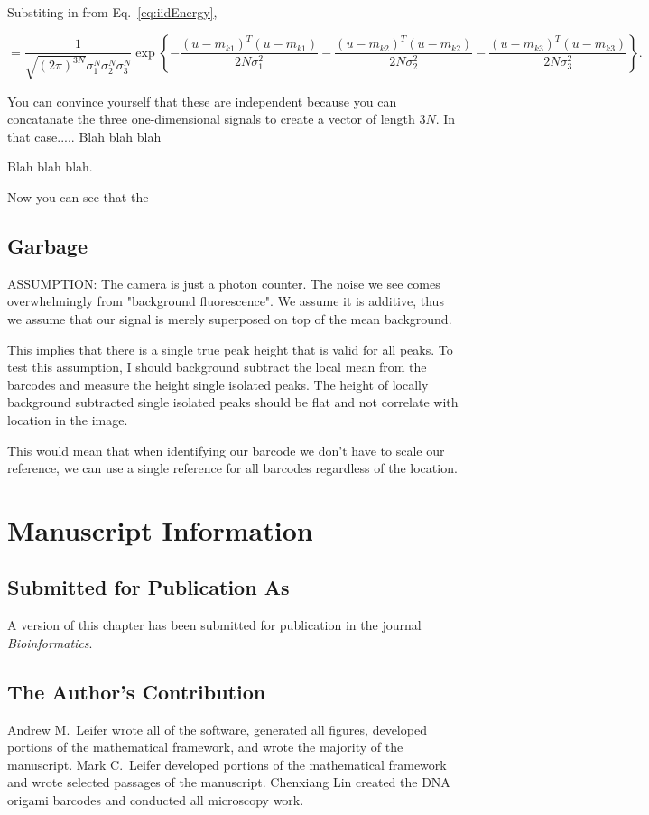 Substiting in from Eq.~\ref{eq:iidEnergy},

\begin{equation}
= \frac{1}{  \sqrt{ (2\pi)^{3N}} \sigma_1^N\sigma_2^N\sigma_3^N  } \exp\left\{ -\frac{(u-m_{k1})^T(u-m_{k1})} {2 N \sigma_1^2 }   - \frac{(u-m_{k2})^T(u-m_{k2})} {2 N \sigma_2^2 } -\frac{(u-m_{k3})^T(u-m_{k3})} {2 N \sigma_3^2 }    \right\}.
\end{equation}

You can convince yourself that these are independent because you can concatanate the three one-dimensional signals to create a vector of length $3N$. In that case..... Blah blah blah


Blah blah blah.

Now you can see that the 









\subsection{Garbage	} 

ASSUMPTION: The camera is just a photon counter. The noise we see comes overwhelmingly from "background fluorescence". We assume it is additive, thus we assume that our signal is merely superposed on top of the mean background. 

This implies that there is a single true peak height that is valid for all peaks. To test this assumption, I should background subtract the local mean from the barcodes and measure the height single isolated peaks. The height of locally background subtracted single isolated peaks should be flat and not correlate with location in the image.

This would mean that when identifying our barcode we don't have to scale our reference, we can use a single reference for all barcodes regardless of the location.


\section{Manuscript Information}
\subsection{Submitted for Publication As}
A version of this chapter has been submitted for publication in the journal \textit{Bioinformatics}.

\subsection{The Author's Contribution}
Andrew M.~Leifer wrote all of the software, generated all figures, developed portions of the mathematical framework, and wrote the majority of the manuscript. Mark C.~Leifer developed portions of the mathematical framework and wrote selected passages of the manuscript. Chenxiang Lin created the DNA origami barcodes and conducted all microscopy work. 
 